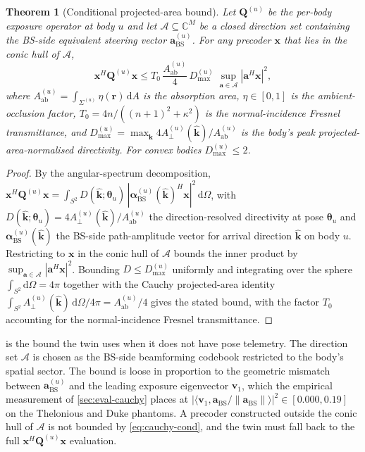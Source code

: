 \documentclass[journal,twocolumn,10pt]{IEEEtran}
\theoremstyle{plain}
\newtheorem{theorem}{Theorem}
\theoremstyle{remark}
\newcommand{\khat}{\hat{\bm{k}}}
\newcommand{\rr}{\mathbf{r}}
\newcommand{\xx}{\mathbf{x}}
\newcommand{\Aab}{A_{\mathrm{ab}}}
\newcommand{\Aperp}{A_\perp}
\newcommand{\Qmat}{\mathbf{Q}}
\newcommand{\diff}{\mathrm{d}}
\newcommand{\Complex}{\mathbb{C}}
\begin{document}
\begin{theorem}[Conditional projected-area bound]\label{thm:cauchy-cond}
Let $\Qmat^{(u)}$ be the per-body exposure operator at body $u$ and
let $\mathcal{A} \subseteq \Complex^M$ be a closed direction set
containing the BS-side equivalent steering vector
$\mathbf{a}_{\mathrm{BS}}^{(u)}$. For any precoder $\xx$ that lies in
the conic hull of $\mathcal{A}$,
\begin{equation}\label{eq:cauchy-cond}
  \xx^H \Qmat^{(u)} \xx \leq T_0\,\frac{\Aab^{(u)}}{4}\,
  D_{\max}^{(u)}\;\sup_{\mathbf{a} \in \mathcal{A}}
  |\mathbf{a}^H \xx|^2,
\end{equation}
where $\Aab^{(u)} = \int_{\Sigma^{(u)}} \eta(\rr)\,\diff A$ is the
absorption area, $\eta \in [0,1]$ is the ambient-occlusion factor,
$T_0 = 4 n / ((n+1)^2 + \kappa^2)$ is the normal-incidence Fresnel
transmittance, and $D_{\max}^{(u)} = \max_{\khat}
4\Aperp^{(u)}(\khat)/\Aab^{(u)}$ is the body's peak
projected-area-normalised directivity. For convex bodies
$D_{\max}^{(u)} \leq 2$.
\end{theorem}

\begin{proof}
By the angular-spectrum decomposition,
$\xx^H \Qmat^{(u)} \xx = \int_{S^2} D(\khat;\bm\theta_u)\,
|\bm\alpha_{\mathrm{BS}}^{(u)}(\khat)^H \xx|^2\,\diff\Omega$,
with $D(\khat;\bm\theta_u) = 4 \Aperp^{(u)}(\khat)/\Aab^{(u)}$ the
direction-resolved directivity at pose $\bm\theta_u$ and
$\bm\alpha_{\mathrm{BS}}^{(u)}(\khat)$ the BS-side path-amplitude
vector for arrival direction $\khat$ on body $u$. Restricting to
$\xx$ in the conic hull of $\mathcal{A}$ bounds the inner product by
$\sup_{\mathbf{a} \in \mathcal{A}} |\mathbf{a}^H \xx|^2$. Bounding
$D \leq D_{\max}^{(u)}$ uniformly and integrating over the sphere
$\int_{S^2} \diff\Omega = 4\pi$ together with the Cauchy
projected-area identity
$\int_{S^2} \Aperp^{(u)}(\khat)\,\diff\Omega/4\pi = \Aab^{(u)}/4$
gives the stated bound, with the factor $T_0$ accounting for the
normal-incidence Fresnel transmittance.
\end{proof}

 is the bound the twin uses when it does not
have pose telemetry. The direction set $\mathcal{A}$ is chosen as
the BS-side beamforming codebook restricted to the body's spatial
sector. The bound is loose in proportion to the geometric mismatch
between $\mathbf{a}_{\mathrm{BS}}^{(u)}$ and the leading exposure
eigenvector $\mathbf{v}_1$, which the empirical measurement of
\cref{sec:eval-cauchy} places at $|\langle \mathbf{v}_1,
\mathbf{a}_{\mathrm{BS}}/\|\mathbf{a}_{\mathrm{BS}}\| \rangle|^2 \in
[0.000, 0.19]$ on the Thelonious and Duke phantoms. A precoder
constructed outside the conic hull of $\mathcal{A}$ is not bounded
by \cref{eq:cauchy-cond}, and the twin must fall back to the full
$\xx^H \Qmat^{(u)} \xx$ evaluation.




\end{document}
